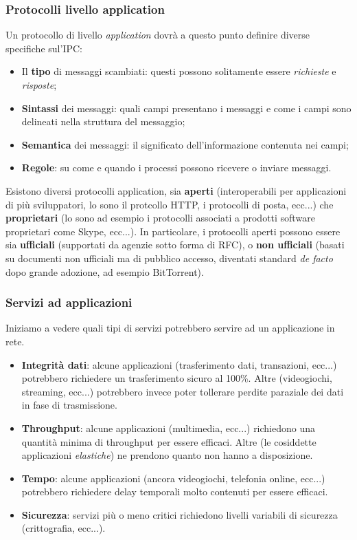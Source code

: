\documentclass[a4paper,11pt]{article}
\begin{document}
\subsubsection{Protocolli livello application}
Un protocollo di livello \textit{application} dovrà a questo punto definire diverse specifiche sul'IPC:
\begin{itemize}
	\item Il \textbf{tipo} di messaggi scambiati: questi possono solitamente essere \textit{richieste} e \textit{risposte};
	\item \textbf{Sintassi} dei messaggi: quali campi presentano i messaggi e come i campi sono delineati nella struttura del messaggio;
	\item \textbf{Semantica} dei messaggi: il significato dell'informazione contenuta nei campi;
	\item \textbf{Regole}: su come e quando i processi possono ricevere o inviare messaggi.
\end{itemize}

Esistono diversi protocolli application, sia \textbf{aperti} (interoperabili per applicazioni di più sviluppatori, lo sono il protcollo HTTP, i protocolli di posta, ecc...) che \textbf{proprietari} (lo sono ad esempio i protocolli associati a prodotti software proprietari come Skype, ecc...).
In particolare, i protocolli aperti possono essere sia \textbf{ufficiali} (supportati da agenzie sotto forma di RFC), o \textbf{non ufficiali} (basati su documenti non ufficiali ma di pubblico accesso, diventati standard \textit{de facto} dopo grande adozione, ad esempio BitTorrent).

\subsubsection{Servizi ad applicazioni}
Iniziamo a vedere quali tipi di servizi potrebbero servire ad un applicazione in rete.

\begin{itemize}
	\item \textbf{Integrità dati}: alcune applicazioni (trasferimento dati, transazioni, ecc...) potrebbero richiedere un trasferimento sicuro al 100\%. Altre (videogiochi, streaming, ecc...) potrebbero invece poter tollerare perdite paraziale dei dati in fase di trasmissione.
	\item \textbf{Throughput}: alcune applicazioni (multimedia, ecc...) richiedono una quantità minima di throughput per essere efficaci. Altre (le cosiddette applicazioni \textit{elastiche}) ne prendono quanto non hanno a disposizione.
	\item \textbf{Tempo}: alcune applicazioni (ancora videogiochi, telefonia online, ecc...) potrebbero richiedere delay temporali molto contenuti per essere efficaci.
	\item \textbf{Sicurezza}: servizi più o meno critici richiedono livelli variabili di sicurezza (crittografia, ecc...).
\end{itemize}
\end{document}
